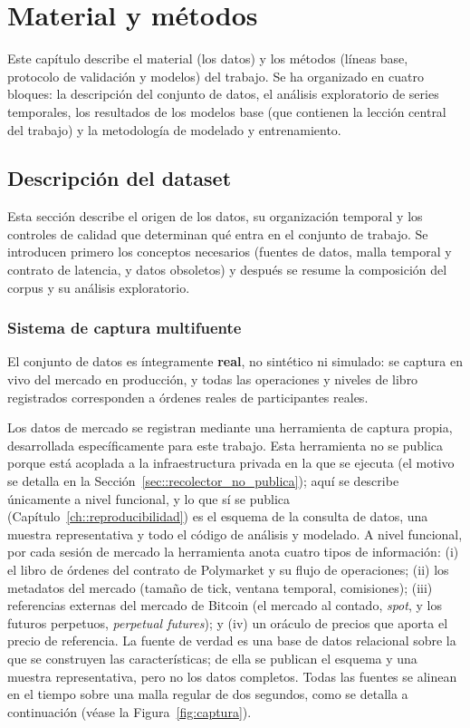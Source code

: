 %
\chapter{Material y métodos}
\label{ch::metodos}

Este capítulo describe el material (los datos) y los métodos (líneas base, protocolo de
validación y modelos) del trabajo. Se ha organizado en cuatro bloques: la descripción del
conjunto de datos, el análisis exploratorio de series temporales, los resultados de los
modelos base (que contienen la lección central del trabajo) y la metodología de modelado y
entrenamiento.

\section{Descripción del dataset}

Esta sección describe el origen de los datos, su organización temporal y los controles de
calidad que determinan qué entra en el conjunto de trabajo. Se introducen primero los
conceptos necesarios (fuentes de datos, malla temporal y contrato de latencia, y datos
obsoletos) y después se resume la composición del corpus y su análisis exploratorio.

\subsection{Sistema de captura multifuente}
\label{sec::captura}

El conjunto de datos es íntegramente \textbf{real}, no sintético ni simulado: se captura en
vivo del mercado en producción, y todas las operaciones y niveles de libro registrados
corresponden a órdenes reales de participantes reales.

Los datos de mercado se registran mediante una herramienta de captura propia, desarrollada
específicamente para este trabajo. Esta herramienta no se publica porque está acoplada a la
infraestructura privada en la que se ejecuta (el motivo se detalla en la
Sección~\ref{sec::recolector_no_publica}); aquí se describe únicamente a nivel funcional, y lo
que sí se publica
(Capítulo~\ref{ch::reproducibilidad}) es el esquema de la consulta de datos, una muestra
representativa y todo el código de análisis y modelado. A nivel funcional, por cada sesión de
mercado la herramienta anota cuatro tipos de información: (i) el libro de órdenes del contrato
de Polymarket y su flujo de operaciones; (ii) los metadatos del mercado (tamaño de tick,
ventana temporal, comisiones); (iii) referencias externas del mercado de Bitcoin (el mercado
al contado, \emph{spot}, y los futuros perpetuos, \emph{perpetual futures}); y (iv) un
oráculo de precios que aporta el precio de referencia. La fuente de verdad es una base de
datos relacional sobre la que se construyen las características; de ella se publican el
esquema y una muestra representativa, pero no los datos completos. Todas las fuentes se
alinean en el tiempo sobre una malla regular de dos segundos, como se detalla a continuación
(véase la Figura~\ref{fig:captura}).


